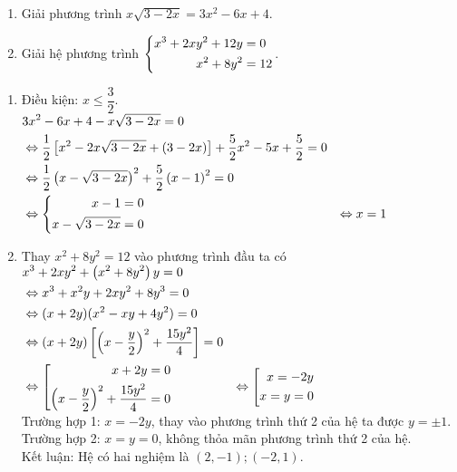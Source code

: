 \begin{ex}%
     \hfill
    \begin{enumerate}    
        \item Giải phương trình $x\sqrt{3-2x}=3x^2-6x+4$.
        \item Giải hệ phương trình $\left\{\begin{aligned}x^3+2xy^2+12y&=0\\ x^2+8y^2&=12\end{aligned}\right.$.
    \end{enumerate}
\loigiai
    {
    \begin{enumerate}
        \item Điều kiện: $x\le \dfrac{3}{2}$.\\
        $
        \begin{aligned}
       &3x^2-6x+4-x\sqrt{3-2x}=0\\
       &\Leftrightarrow \dfrac{1}{2}\left[ {x^2-2x\sqrt{3-2x}+(3-2x)} \right]+\dfrac{5}{2}x^2-5x+\dfrac{5}{2}=0\\
       &\Leftrightarrow \dfrac{1}{2}\left( {x-\sqrt{3-2x}}\right)^2+\dfrac{5}{2}\left({x-1}\right)^2=0\\
       &\Leftrightarrow \left\{\begin{aligned}x-1&=0\\ x-\sqrt{3-2x}&=0\end{aligned}\right.
       &\Leftrightarrow x=1
        \end{aligned}
        $
        \item Thay $x^2+8y^2=12$ vào phương trình đầu ta có\\
        $
        \begin{aligned}
        &x^3+2xy^2+\left({x^2+8y^2}\right)y=0\\
        &\Leftrightarrow x^3+x^2y+2xy^2+8y^3=0\\
        &\Leftrightarrow (x+2y)(x^2-xy+4y^2)=0\\
        & \Leftrightarrow (x+2y)\left[\left(x-\dfrac{y}{2}\right)^2+\dfrac{15y^2}{4}\right]=0\\
        &\Leftrightarrow \left[ \begin{gathered}
        \hfill x+2y=0 \\
        \hfill \left(x-\dfrac{y}{2}\right)^2+\dfrac{15y^2}{4}=0\\ 
        \end{gathered}  \right.
        &\Leftrightarrow \left[ \begin{gathered}
        \hfill x=-2y \\
        \hfill x=y=0\\ 
        \end{gathered}  \right.
        \end{aligned}
        $\\
        Trường hợp 1: $x=-2y$, thay vào phương trình thứ 2 của hệ ta được $y=\pm 1$. \\
        Trường hợp 2: $x=y=0$, không thỏa mãn phương trình thứ 2 của hệ.\\
        Kết luận: Hệ có hai nghiệm là $(2,-1); (-2,1)$.
    \end{enumerate}
    }
\end{ex}

